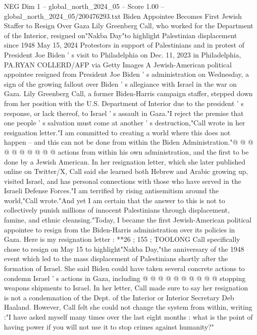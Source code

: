 \begin{textsample}{NEG Dim 1 – global\_north\_2024\_05 – Score 1.00 – global\_north\_2024\_05/200476293.txt}  \label{ex:f1_neg_174}
Biden Appointee Becomes First Jewish Staffer to Resign Over Gaza Lily Greenberg Call, who worked for the Department of the Interior, resigned on"Nakba Day"to highlight Palestinian displacement since 1948 May 15, 2024 Protestors in support of Palestinians and in protest of President Joe Biden ' s visit to Philadelphia on Dec. 11, 2023 in Philadelphia, PA.RYAN COLLERD/AFP via Getty Images A Jewish-American political appointee resigned from President Joe Biden ' s administration on Wednesday, a sign of the growing fallout over Biden ' s allegiance with Israel in the war on Gaza.
Lily Greenberg Call, a former Biden-Harris campaign staffer, stepped down from her position with the U.S.
Department of Interior due to the president ' s response, or lack thereof, to Israel ' s assault in Gaza."I reject the premise that one people ' s salvation must come at another ' s destruction,"Call wrote in her resignation letter."I am committed to creating a world where this does not happen -- and this can not be done from within the Biden Administration."@ @ @ @ @ @ @ @ @ @ actions from within his own administration, and the first to be done by a Jewish American.
In her resignation letter, which she later published online on Twitter/X, Call said she learned both Hebrew and Arabic growing up, visited Israel, and has personal connections with those who have served in the Israeli Defense Forces."I am terrified by rising antisemitism around the world,"Call wrote."And yet I am certain that the answer to this is not to collectively punish millions of innocent Palestinians through displacement, famine, and ethnic cleansing."Today, I became the first Jewish-American political appointee to resign from the Biden-Harris administration over its policies in Gaza.
Here is my resignation letter : **26 ; 155 ; TOOLONG Call specifically chose to resign on May 15 to highlight"Nakba Day,"the anniversary of the 1948 event which led to the mass displacement of Palestinians shortly after the formation of Israel.
She said Biden could have taken several concrete actions to condemn Israel ' s actions in Gaza, including @ @ @ @ @ @ @ @ @ @ stopping weapons shipments to Israel.
In her letter, Call made sure to say her resignation is not a condemnation of the Dept. of the Interior or Interior Secretary Deb Haaland.
However, Call felt she could not change the system from within, writing :"I have asked myself many times over the last eight months : what is the point of having power if you will not use it to stop crimes against humanity?"

\end{textsample}
